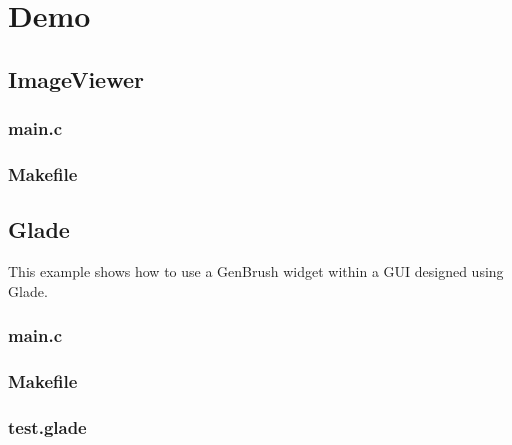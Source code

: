 \section{Demo}

\subsection{ImageViewer}

\subsubsection{main.c}

\begin{scriptsize}
\begin{ttfamily}

\end{ttfamily}
\end{scriptsize}

\subsubsection{Makefile}

\begin{scriptsize}
\begin{ttfamily}

\end{ttfamily}
\end{scriptsize}

\subsection{Glade}

This example shows how to use a GenBrush widget within a GUI designed using Glade.

\subsubsection{main.c}

\begin{scriptsize}
\begin{ttfamily}

\end{ttfamily}
\end{scriptsize}

\subsubsection{Makefile}

\begin{scriptsize}
\begin{ttfamily}

\end{ttfamily}
\end{scriptsize}

\subsubsection{test.glade}

\begin{scriptsize}
\begin{ttfamily}

\end{ttfamily}
\end{scriptsize}
